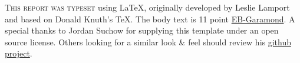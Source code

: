 \newpage

\begin{figure}
  \vspace{20pt}
  \centering
  \hspace*{-32pt}
\end{figure}


\begin{center}
\parbox{205pt}{\lettrine[lines=2,slope=-2pt,findent=4pt, nindent=0pt]{\textcolor{SchoolColor}{T}}{his report was typeset} using \LaTeX, originally developed by Leslie Lamport and based on Donald Knuth's \TeX. The body text is 11 point \href{https://github.com/georgd/EB-Garamond}{EB-Garamond}. A special thanks to Jordan Suchow for supplying this template under an open source license. Others looking for a similar look \& feel should review his \href{https://github.com/suchow/Dissertate}{github project}.}
\end{center}
